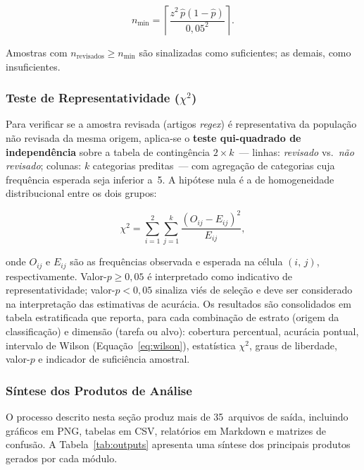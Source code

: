 \begin{equation}
\label{eq:nmin}
  n_{\min}
  =
  \left\lceil
    \frac{z^{2}\,\hat{p}(1-\hat{p})}{0{,}05^{2}}
  \right\rceil.
\end{equation}

Amostras com $n_{\text{revisados}} \geq n_{\min}$ são sinalizadas
como suficientes; as demais, como insuficientes.


\subsubsection{Teste de Representatividade ($\chi^{2}$)}

Para verificar se a amostra revisada (artigos \textit{regex}) é
representativa da população não revisada da mesma origem,
aplica-se o \textbf{teste qui-quadrado de independência} sobre a
tabela de contingência $2 \times k$~--- linhas: \textit{revisado}
vs.\ \textit{não revisado}; colunas: $k$ categorias preditas~---
com agregação de categorias cuja frequência esperada seja inferior
a~5. A hipótese nula é a de homogeneidade distribucional entre os
dois grupos:

\begin{equation}
\label{eq:chi2}
  \chi^{2}
  =
  \sum_{i=1}^{2}\sum_{j=1}^{k}
  \frac{(O_{ij} - E_{ij})^{2}}{E_{ij}},
\end{equation}

\noindent onde $O_{ij}$ e $E_{ij}$ são as frequências observada e
esperada na célula $(i,\,j)$, respectivamente. Valor-$p \geq 0{,}05$
é interpretado como indicativo de representatividade; valor-$p <
0{,}05$ sinaliza viés de seleção e deve ser considerado na
interpretação das estimativas de acurácia. Os resultados são
consolidados em tabela estratificada que reporta, para cada
combinação de estrato (origem da classificação) e dimensão (tarefa
ou alvo): cobertura percentual, acurácia pontual, intervalo de
Wilson (Equação~\ref{eq:wilson}), estatística $\chi^{2}$, graus de
liberdade, valor-$p$ e indicador de suficiência amostral.


\subsubsection{Síntese dos Produtos de Análise}

O processo descrito nesta seção produz mais de 35~arquivos de saída,
incluindo gráficos em PNG, tabelas em CSV, relatórios em Markdown e
matrizes de confusão. A Tabela~\ref{tab:outputs} apresenta uma
síntese dos principais produtos gerados por cada módulo.

